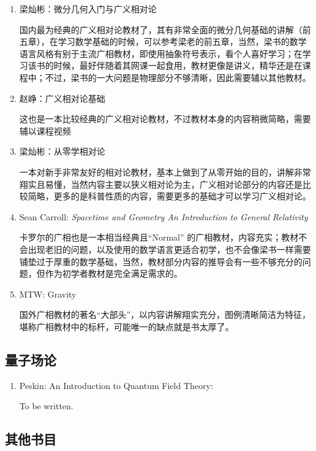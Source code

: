 \begin{enumerate}
  \item 梁灿彬：微分几何入门与广义相对论
  
  国内最为经典的广义相对论教材了，其有非常全面的微分几何基础的讲解（前五章），在学习数学基础的时候，可以参考梁老的前五章，当然，梁书的数学语言风格有别于主流广相教材，即使用抽象符号表示，看个人喜好学习；在学习该书的时候，最好伴随着其网课一起食用，教材更像是讲义，精华还是在课程中；不过，梁书的一大问题是物理部分不够清晰，因此需要辅以其他教材。
  \item 赵峥：广义相对论基础
  
  这也是一本比较经典的广义相对论教材，不过教材本身的内容稍微简略，需要辅以课程视频
  \item 梁灿彬：从零学相对论
  
  一本对新手非常友好的相对论教材，基本上做到了从零开始的目的，讲解非常翔实且易懂，当然内容主要以狭义相对论为主，广义相对论部分的内容还是比较简略，更多的是科普性质的内容，需要更多的基础才可以学习广义相对论。
  \item Sean Carroll: \textit{Spacetime and Geometry An Introduction to General Relativity}
  
  卡罗尔的广相也是一本相当经典且“Normal” 的广相教材，内容充实；教材不会出现老旧的问题，以及使用的数学语言更适合初学，也不会像梁书一样需要铺垫过于厚重的数学基础，当然，教材部分内容的推导会有一些不够充分的问题，但作为初学者教材是完全满足需求的。
  \item MTW: Gravity
  
  国外广相教材的著名“大部头”，以内容讲解翔实充分，图例清晰简洁为特征，堪称广相教材中的标杆，可能唯一的缺点就是书太厚了。
\end{enumerate}


\subsection*{量子场论}

\begin{enumerate}
  \item Peskin: An Introduction to Quantum Field Theory:

  To be written.
\end{enumerate}


\subsection*{其他书目}




